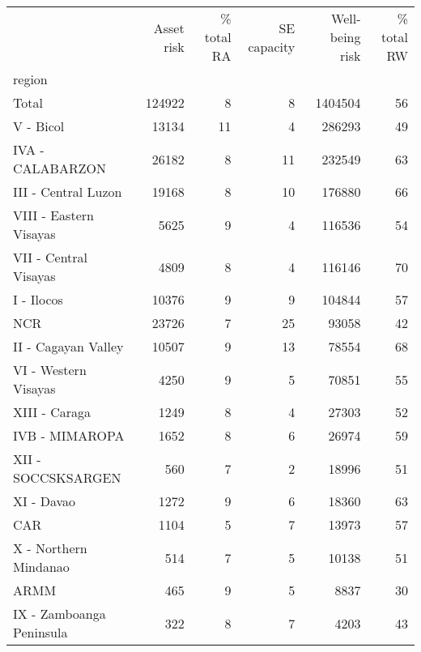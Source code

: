 \begin{tabular}{lrrrrr}
\toprule
{} &  Asset risk &  \% total RA &  SE capacity &  Well-being risk &  \% total RW \\
region                   &             &             &              &                  &             \\
\midrule
Total                    &      124922 &           8 &            8 &          1404504 &          56 \\
V - Bicol                &       13134 &          11 &            4 &           286293 &          49 \\
IVA - CALABARZON         &       26182 &           8 &           11 &           232549 &          63 \\
III - Central Luzon      &       19168 &           8 &           10 &           176880 &          66 \\
VIII - Eastern Visayas   &        5625 &           9 &            4 &           116536 &          54 \\
VII - Central Visayas    &        4809 &           8 &            4 &           116146 &          70 \\
I - Ilocos               &       10376 &           9 &            9 &           104844 &          57 \\
NCR                      &       23726 &           7 &           25 &            93058 &          42 \\
II - Cagayan Valley      &       10507 &           9 &           13 &            78554 &          68 \\
VI - Western Visayas     &        4250 &           9 &            5 &            70851 &          55 \\
XIII - Caraga            &        1249 &           8 &            4 &            27303 &          52 \\
IVB - MIMAROPA           &        1652 &           8 &            6 &            26974 &          59 \\
XII - SOCCSKSARGEN       &         560 &           7 &            2 &            18996 &          51 \\
XI - Davao               &        1272 &           9 &            6 &            18360 &          63 \\
CAR                      &        1104 &           5 &            7 &            13973 &          57 \\
X - Northern Mindanao    &         514 &           7 &            5 &            10138 &          51 \\
ARMM                     &         465 &           9 &            5 &             8837 &          30 \\
IX - Zamboanga Peninsula &         322 &           8 &            7 &             4203 &          43 \\
\bottomrule
\end{tabular}
